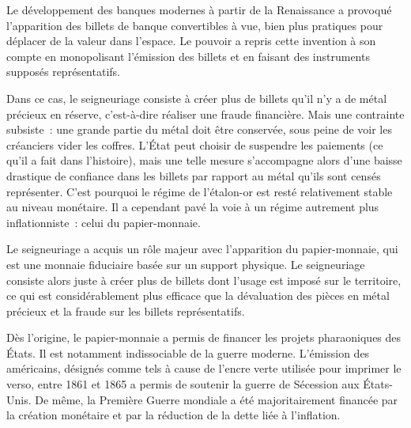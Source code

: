 
Le développement des banques modernes à partir de la Renaissance a provoqué l'apparition des billets de banque convertibles à vue, bien plus pratiques pour déplacer de la valeur dans l'espace. Le pouvoir a repris cette invention à son compte en monopolisant l'émission des billets et en faisant des instruments supposés représentatifs.

Dans ce cas, le seigneuriage consiste à créer plus de billets qu'il n'y a de métal précieux en réserve, c'est-à-dire réaliser une fraude financière. Mais une contrainte subsiste~: une grande partie du métal doit être conservée, sous peine de voir les créanciers vider les coffres. L'État peut choisir de suspendre les paiements (ce qu'il a fait dans l'histoire), mais une telle mesure s'accompagne alors d'une baisse drastique de confiance dans les billets par rapport au métal qu'ils sont censés représenter. C'est pourquoi le régime de l'étalon-or est resté relativement stable au niveau monétaire. Il a cependant pavé la voie à un régime autrement plus inflationniste~: celui du papier-monnaie.


Le seigneuriage a acquis un rôle majeur avec l'apparition du papier-monnaie, qui est une monnaie fiduciaire basée sur un support physique. Le seigneuriage consiste alors juste à créer plus de billets dont l'usage est imposé sur le territoire, ce qui est considérablement plus efficace que la dévaluation des pièces en métal précieux et la fraude sur les billets représentatifs.


Dès l'origine, le papier-monnaie a permis de financer les projets pharaoniques des États. Il est notamment indissociable de la guerre moderne. L'émission des  américains, désignés comme tels à cause de l'encre verte utilisée pour imprimer le verso, entre 1861 et 1865 a permis de soutenir la guerre de Sécession aux États-Unis. De même, la Première Guerre mondiale a été majoritairement financée par la création monétaire et par la réduction de la dette liée à l'inflation.

